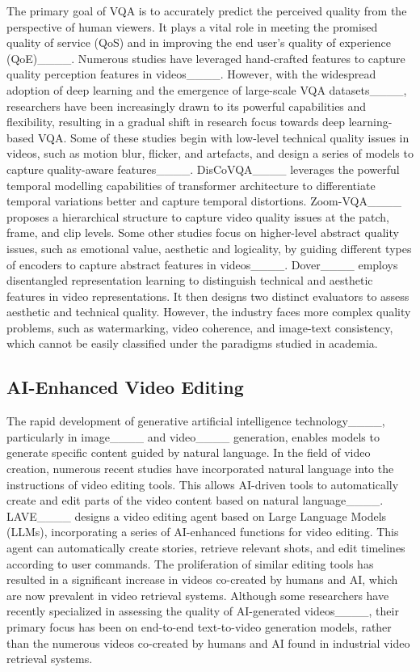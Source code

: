 The primary goal of VQA is to accurately predict the perceived quality from the perspective of human viewers. It plays a vital role in meeting the promised quality of service (QoS) and in improving the end user’s quality of experience (QoE)____.
Numerous studies have leveraged hand-crafted features to capture quality perception features in videos____. 
However, with the widespread adoption of deep learning and the emergence of large-scale VQA datasets____, researchers have been increasingly drawn to its powerful capabilities and flexibility, resulting in a gradual shift in research focus towards deep learning-based VQA.
Some of these studies begin with low-level technical quality issues in videos, such as motion blur, flicker, and artefacts, and design a series of models to capture quality-aware features____.
DisCoVQA____ leverages the powerful temporal modelling capabilities of transformer architecture to differentiate temporal variations better and capture temporal distortions.
Zoom-VQA____ proposes a hierarchical structure to capture video quality issues at the patch, frame, and clip levels. 
Some other studies focus on higher-level abstract quality issues, such as emotional value, aesthetic and logicality, by guiding different types of encoders to capture abstract features in videos____. 
Dover____ employs disentangled representation learning to distinguish technical and aesthetic features in video representations. It then designs two distinct evaluators to assess aesthetic and technical quality.
However, the industry faces more complex quality problems, such as watermarking, video coherence, and image-text consistency, which cannot be easily classified under the paradigms studied in academia.


\subsection{AI-Enhanced Video Editing}

The rapid development of generative artificial intelligence technology____, particularly in image____ and video____ generation, enables models to generate specific content guided by natural language.
In the field of video creation, numerous recent studies have incorporated natural language into the instructions of video editing tools. This allows AI-driven tools to automatically create and edit parts of the video content based on natural language____.
LAVE____ designs a video editing agent based on Large Language Models (LLMs), incorporating a series of AI-enhanced functions for video editing. This agent can automatically create stories, retrieve relevant shots, and edit timelines according to user commands.
The proliferation of similar editing tools has resulted in a significant increase in videos co-created by humans and AI, which are now prevalent in video retrieval systems.
Although some researchers have recently specialized in assessing the quality of AI-generated videos____, their primary focus has been on end-to-end text-to-video generation models, rather than the numerous videos co-created by humans and AI found in industrial video retrieval systems.